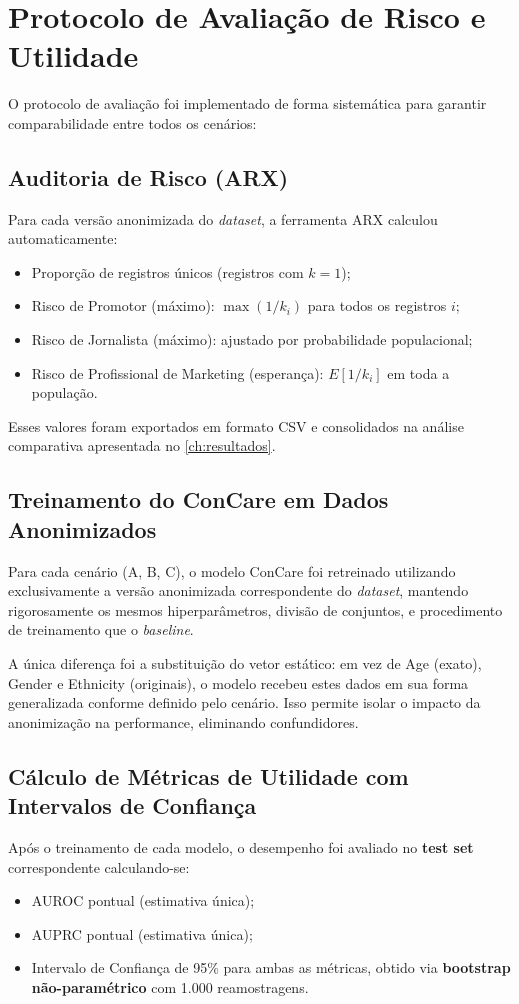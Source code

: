 \section{Protocolo de Avaliação de Risco e Utilidade}
\label{sec:dev-protocolo-avaliacao}

O protocolo de avaliação foi implementado de forma sistemática para garantir comparabilidade entre todos os cenários:

\subsection{Auditoria de Risco (ARX)}
Para cada versão anonimizada do \textit{dataset}, a ferramenta ARX calculou automaticamente:
\begin{itemize}
    \item Proporção de registros únicos (registros com $k=1$);
    \item Risco de Promotor (máximo): $\max(1/k_i)$ para todos os registros $i$;
    \item Risco de Jornalista (máximo): ajustado por probabilidade populacional;
    \item Risco de Profissional de Marketing (esperança): $E[1/k_i]$ em toda a população.
\end{itemize}

Esses valores foram exportados em formato CSV e consolidados na análise comparativa apresentada no \autoref{ch:resultados}.

\subsection{Treinamento do ConCare em Dados Anonimizados}
Para cada cenário (A, B, C), o modelo ConCare foi retreinado utilizando exclusivamente a versão anonimizada correspondente do \textit{dataset}, mantendo rigorosamente os mesmos hiperparâmetros, divisão de conjuntos, e procedimento de treinamento que o \textit{baseline}. 

A única diferença foi a substituição do vetor estático: em vez de Age (exato), Gender e Ethnicity (originais), o modelo recebeu estes dados em sua forma generalizada conforme definido pelo cenário. Isso permite isolar o impacto da anonimização na performance, eliminando confundidores.

\subsection{Cálculo de Métricas de Utilidade com Intervalos de Confiança}
Após o treinamento de cada modelo, o desempenho foi avaliado no \textbf{test set} correspondente calculando-se:
\begin{itemize}
    \item AUROC pontual (estimativa única);
    \item AUPRC pontual (estimativa única);
    \item Intervalo de Confiança de 95\% para ambas as métricas, obtido via \textbf{bootstrap não-paramétrico} com 1.000 reamostragens.
\end{itemize}

